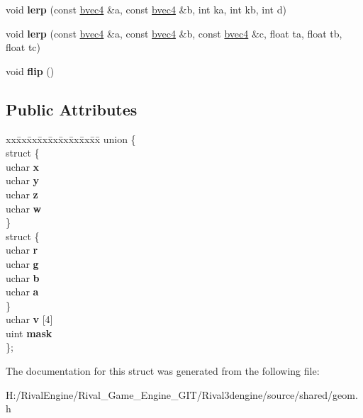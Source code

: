 \begin{DoxyCompactItemize}
\item 
\mbox{\label{structbvec4_adb9692d7b45258d290a5f53a6c01a4d9}} 
void {\bfseries lerp} (const \hyperlink{structbvec4}{bvec4} \&a, const \hyperlink{structbvec4}{bvec4} \&b, int ka, int kb, int d)
\item 
\mbox{\label{structbvec4_ac5aa20a51527c1df55e7a99424e0d4c5}} 
void {\bfseries lerp} (const \hyperlink{structbvec4}{bvec4} \&a, const \hyperlink{structbvec4}{bvec4} \&b, const \hyperlink{structbvec4}{bvec4} \&c, float ta, float tb, float tc)
\item 
\mbox{\label{structbvec4_a988285e635ee8c6a1e044e9adc5d0d2d}} 
void {\bfseries flip} ()
\end{DoxyCompactItemize}
\subsection*{Public Attributes}
\begin{DoxyCompactItemize}
\item 
\mbox{\label{structbvec4_a59e9cde0af46d0182bb5cfa4a89e1233}} 
\begin{tabbing}
xx\=xx\=xx\=xx\=xx\=xx\=xx\=xx\=xx\=\kill
union \{\\
\mbox{\label{unionbvec4_1_1_0D207_ad99206f115276e8155a5f39a2958b7ad}} 
\>struct \{\\
\>\>uchar {\bfseries x}\\
\>\>uchar {\bfseries y}\\
\>\>uchar {\bfseries z}\\
\>\>uchar {\bfseries w}\\
\>\} \\
\mbox{\label{unionbvec4_1_1_0D207_af335e7e6224c0fe83e84ed901593a078}} 
\>struct \{\\
\>\>uchar {\bfseries r}\\
\>\>uchar {\bfseries g}\\
\>\>uchar {\bfseries b}\\
\>\>uchar {\bfseries a}\\
\>\} \\
\>uchar {\bfseries v} \mbox{[}4\mbox{]}\\
\>uint {\bfseries mask}\\
\}; \\

\end{tabbing}\end{DoxyCompactItemize}


The documentation for this struct was generated from the following file\+:\begin{DoxyCompactItemize}
\item 
H\+:/\+Rival\+Engine/\+Rival\+\_\+\+Game\+\_\+\+Engine\+\_\+\+G\+I\+T/\+Rival3dengine/source/shared/geom.\+h\end{DoxyCompactItemize}
